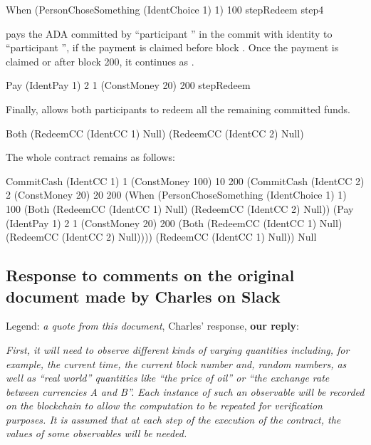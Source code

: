 \documentclass[
      acmsmall
    , screen
    , review=true
  ]{acmart}
\begin{document}
\begin{haskellcode}
When (PersonChoseSomething (IdentChoice 1) 1) 100
     stepRedeem
     step4
\end{haskellcode}

 pays the  ADA committed by ``participant '' in the commit with 
identity  to ``participant '', if the payment is claimed before block 
. Once the payment is claimed or after block 200, it continues as .

\begin{haskellcode}
Pay (IdentPay 1) 2 1 (ConstMoney 20) 200 stepRedeem
\end{haskellcode}

Finally,  allows both participants to redeem all the remaining committed funds.

\begin{haskellcode}
Both (RedeemCC (IdentCC 1) Null)
     (RedeemCC (IdentCC 2) Null)
\end{haskellcode}

The whole contract remains as follows:
\begin{haskellcode}
CommitCash (IdentCC 1) 1
           (ConstMoney 100)
           10 200
           (CommitCash (IdentCC 2) 2
                       (ConstMoney 20)
                       20 200
                       (When (PersonChoseSomething (IdentChoice 1) 1)
                             100
                             (Both (RedeemCC (IdentCC 1) Null)
                                   (RedeemCC (IdentCC 2) Null))
                             (Pay (IdentPay 1) 2 1
                                  (ConstMoney 20)
                                  200
                                  (Both (RedeemCC (IdentCC 1) Null)
                                        (RedeemCC (IdentCC 2) Null))))
                       (RedeemCC (IdentCC 1) Null))
           Null
\end{haskellcode}


\subsection{Response to comments on the original document made by Charles on Slack}

Legend: {\it a quote from this document}, Charles' response, {\bf our reply}:


{\it
First, it will need to observe different kinds of varying quantities including, for example, the current time, the current block number and, random numbers, as well as ``real world'' quantities like ``the price of oil'' or ``the exchange rate between currencies A and B''. Each instance of such an observable will be recorded on the blockchain to allow the computation to be repeated for verification purposes. It is assumed that at each step of the execution of the contract, the values of some observables will be needed.
}
\end{document}
